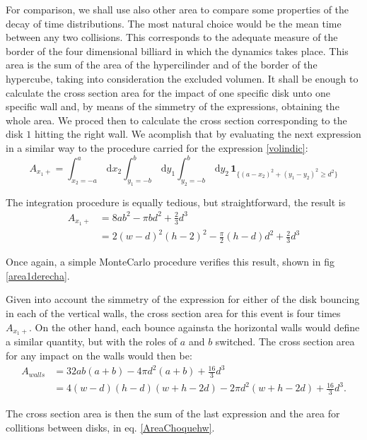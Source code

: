\documentclass[a4paper,10pt]{article}
\newcommand{\rd}{\, \mathrm{d}}
\newcommand{\indicator}[1]{\mathbf{1}_{ \{   #1 \} } }
\begin{document}
For comparison, we shall use also other area to compare
some properties of the decay of time distributions. The most natural choice
would be the mean time between any two collisions. This corresponds
to the adequate measure of the border of the four dimensional
billiard in which the dynamics takes place. This area is
the sum of the area of the hypercilinder and of the border of the
hypercube, taking into consideration the excluded volumen. 
It shall be enough to calculate the cross section area for
the impact of one specific disk unto one specific wall and,
by means of the simmetry of the expressions, obtaining the whole
area. We proced then to calculate the cross section corresponding to 
the disk $1$ hitting the right wall. We acomplish that by
evaluating the next expression in a similar way to
the procedure carried for the expression \ref{volindic}:
\begin{equation}\label{areaindic}
 A_{x_1+} =  \int_{x_2 = -a}^a \rd x_2 
\int_{y_1 = -b}^b \rd y_1 \int_{y_2 = -b}^b \rd y_2 \, \indicator{ (a-x_2)^2 + (y_1-y_2)^2 \ge d^2 }
\end{equation}

The integration procedure is equally tedious, but
straightforward, the result is 
\begin{align}\label{areax1p}
 A_{x_1+} & = 8 a b^2-\pi b d^2 +\frac{2}{3}d^3 \\
  & = 2(w-d)^2 (h-2)^2- \frac{\pi}{2} (h-d) d^2 +\frac{2}{3}d^3 
\end{align}

Once again, a simple MonteCarlo procedure verifies this result,
shown in fig \ref{area1derecha}. 

Given into account the simmetry of the expression for either of 
the disk bouncing in each of the vertical walls, the
cross section area for this event is four times $A_{x_1+}$. On
the other hand, each bounce againsta the horizontal walls would
define a similar quantity, but with the roles of $a$ and $b$ switched.
The cross section area for any impact on the walls would then be:
\begin{align}\label{areax1p}
 A_{walls
} & = 32 a b (a+b)-4 \pi d^2 (a+b) +\frac{16}{3}d^3 \\
 &=  4 (w-d) (h-d)  (w+h-2d) -2 \pi d^2 (w + h-2 d) +\frac{16}{3}d^3. 
\end{align}

The cross section area is then the sum of the last expression
and the area for collitions between disks, in eq. \ref{AreaChoquehw}.
\end{document}
